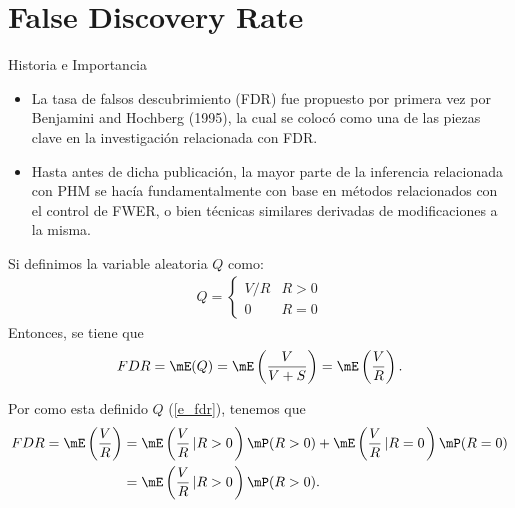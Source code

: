 \section{False Discovery Rate}
\begin{frame}{Historia e Importancia}
	\begin{itemize}[<+- | alert@+>]
		
		\item La tasa de falsos descubrimiento (FDR) fue propuesto por primera vez por Benjamini and Hochberg (1995), la cual se colocó como una de las piezas clave en la investigación relacionada con FDR.
		
		\item Hasta antes de dicha publicación, la mayor parte de la inferencia relacionada con PHM se hacía fundamentalmente con base en métodos relacionados con el control de FWER, o bien técnicas similares derivadas de modificaciones a la misma. 
		
	\end{itemize}

\end{frame}

\begin{frame}
	\begin{df}
		Si definimos la variable aleatoria $Q$ como:
            \begin{align} \label{e_fdr}
                Q=\left\{ \begin{array}{cc}
                V/R & R>0\\
                0 & R=0
            \end{array} \right.
            \end{align}
        Entonces, se tiene que 
            \begin{align*}
                FDR = \mE(Q)=\mE\left( \frac{V}{V+S}\right)=\mE\left( \frac{V}{R} \right).
            \end{align*}
	\end{df}
	        Por como esta definido $Q$ (\ref{e_fdr}), tenemos que 
            \begin{align}\label{igudaldad_Q}
                \nonumber FDR=\mE\left( \frac{V}{R} \right) &= \mE\left( \frac{V}{R}\left| R>0\right. \right)\mP(R>0)+\mE\left( \frac{V}{R}\left| R=0\right. \right)\mP(R=0)\\
                &= \mE\left( \frac{V}{R}\left| R>0\right. \right)\mP(R>0).
            \end{align}
\end{frame}

